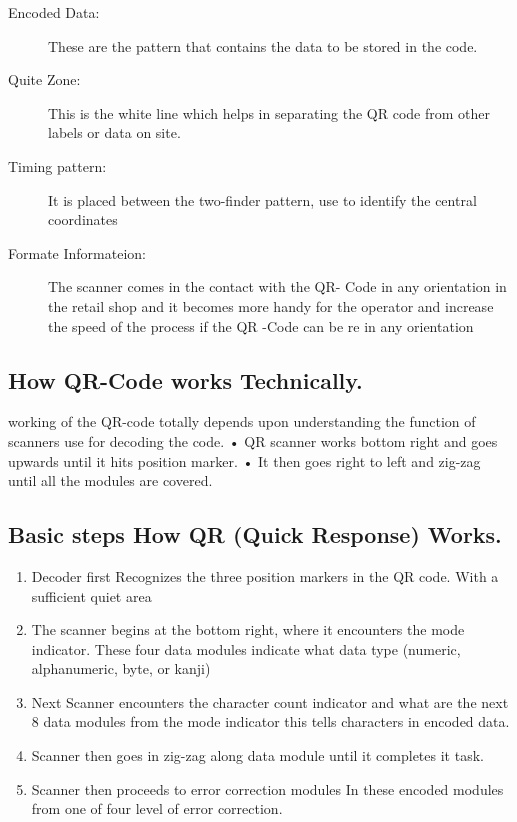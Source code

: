 \begin{description}
	\item[Encoded Data:]
	These are the pattern that contains the data to be stored in the code.
\end{description}

\begin{description}
	\item[Quite Zone:] 
	This is the white line which helps in separating the QR code from other labels or data on site.
\end{description}

\begin{description}
	\item[Timing pattern:] 
	It is placed between the two-finder pattern, use to identify the central coordinates 
\end{description}

\begin{description}
	\item[Formate Informateion:]
	The scanner comes in the contact with the QR- Code in any orientation in the retail shop and it becomes more handy for the operator and increase the speed of the process if the QR -Code can be re in any orientation
\end{description}

\subsection{How QR-Code works Technically.}

working of the QR-code totally depends upon understanding the function of scanners use for decoding the code.
•	QR scanner works bottom right and goes upwards until it hits position marker.
•	It then goes right to left and zig-zag until all the modules are covered.

\subsection{Basic steps How QR (Quick Response) Works.}

\begin{enumerate}
	\item Decoder first Recognizes the three position markers in the QR code. With a sufficient quiet area
	\item The scanner begins at the bottom right, where it encounters the mode indicator. These four data modules indicate what data type (numeric, alphanumeric, byte, or kanji)
	\item Next Scanner encounters the character count indicator and what are the next 8 data modules from the mode indicator this tells characters in encoded data.
	\item Scanner then goes in zig-zag along data module until it completes it task.
	\item Scanner then proceeds to error correction modules In these encoded modules from one of four level of error correction. \cite{Hansen:2017}

\end{enumerate}

